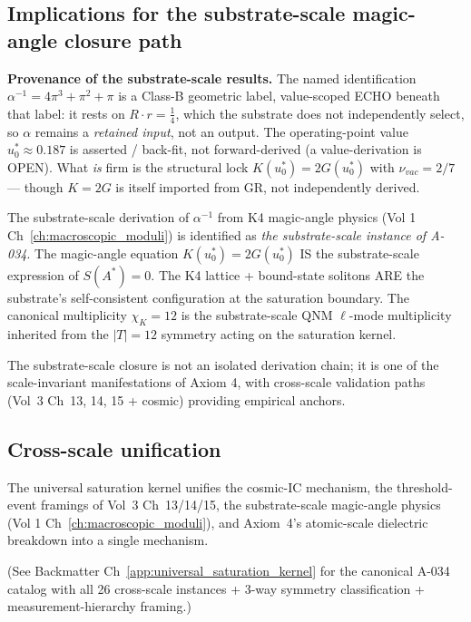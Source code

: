 \subsection{Implications for the substrate-scale magic-angle closure path}

\noindent\textbf{Provenance of the substrate-scale results.} The named identification $\alpha^{-1} = 4\pi^3 + \pi^2 + \pi$ is a Class-B geometric label, value-scoped ECHO beneath that label: it rests on $R\cdot r = \tfrac14$, which the substrate does not independently select, so $\alpha$ remains a \emph{retained input}, not an output. The operating-point value $u_0^* \approx 0.187$ is asserted / back-fit, not forward-derived (a value-derivation is OPEN). What \emph{is} firm is the structural lock $K(u_0^*) = 2G(u_0^*)$ with $\nu_{vac} = 2/7$ --- though $K = 2G$ is itself imported from GR, not independently derived.

The substrate-scale derivation of $\alpha^{-1}$ from K4 magic-angle
physics (Vol 1 Ch~\ref{ch:macroscopic_moduli}) is identified as \emph{the
substrate-scale instance of A-034}. The magic-angle equation
$K(u_0^*) = 2 G(u_0^*)$ IS the substrate-scale expression of $S(A^*) = 0$.
The K4 lattice + bound-state solitons ARE the substrate's self-consistent
configuration at the saturation boundary. The canonical multiplicity
$\chi_K = 12$ is the substrate-scale QNM $\ell$-mode multiplicity inherited
from the $|T| = 12$ symmetry acting on the saturation kernel.

The substrate-scale closure is not an isolated derivation chain; it is one
of the scale-invariant manifestations of Axiom 4, with cross-scale
validation paths (Vol~3 Ch~13, 14, 15 + cosmic) providing empirical anchors.

\subsection{Cross-scale unification}

The universal saturation kernel unifies the cosmic-IC mechanism, the
threshold-event framings of Vol~3 Ch~13/14/15, the substrate-scale
magic-angle physics (Vol 1 Ch~\ref{ch:macroscopic_moduli}), and Axiom~4's
atomic-scale dielectric breakdown into a single mechanism.

(See Backmatter Ch~\ref{app:universal_saturation_kernel} for the canonical
A-034 catalog with all 26 cross-scale instances + 3-way symmetry classification
+ measurement-hierarchy framing.)

